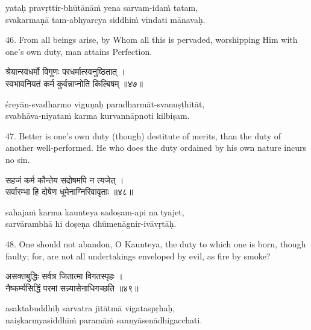 \begin{transliteration}
yataḥ pravṛttir-bhūtānāṁ yena sarvam-idaṁ tatam, \\
svakarmaṇā tam-abhyarcya siddhiṁ vindati mānavaḥ.
\end{transliteration}

46. From all beings arise, by Whom all this is pervaded, worshipping Him with
one's own duty, man attains Perfection.

\begin{gitaverse}
श्रेयान्स्वधर्मो विगुणः परधर्मात्स्वनुष्ठितात् । \\
स्वभावनियतं कर्म कुर्वन्नाप्नोति किल्बिषम् ॥४७॥
\end{gitaverse}

\begin{transliteration}
śreyān-svadharmo viguṇaḥ paradharmāt-svanuṣṭhitāt, \\
svabhāva-niyataṁ karma kurvannāpnoti kilbiṣam.
\end{transliteration}

47. Better is one's own duty (though) destitute of merits, than the duty of
another well-performed. He who does the duty ordained by his own nature incurs
no sin.

\begin{gitaverse}
सहजं कर्म कौन्तेय सदोषमपि न त्यजेत् । \\
सर्वारम्भा हि दोषेण धूमेनाग्निरिवावृताः ॥४८॥
\end{gitaverse}

\begin{transliteration}
sahajaṁ karma kaunteya sadoṣam-api na tyajet, \\
sarvārambhā hi doṣeṇa dhūmenāgnir-ivāvṛtāḥ.
\end{transliteration}

48. One should not abandon, O Kaunteya, the duty to which one is born, though
faulty; for, are not all undertakings enveloped by evil, as fire by smoke?

\begin{gitaverse}
असक्तबुद्धिः सर्वत्र जितात्मा विगतस्पृहः । \\
नैष्कर्म्यसिद्धिं परमां सन्न्यासेनाधिगच्छति ॥४९॥
\end{gitaverse}

\begin{transliteration}
asaktabuddhiḥ sarvatra jitātmā vigataspṛhaḥ, \\
naiṣkarmyasiddhiṁ paramāṁ sannyāsenādhigacchati.
\end{transliteration}


